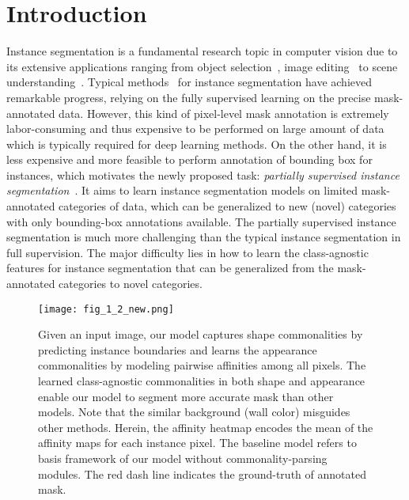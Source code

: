 \documentclass[runningheads]{llncs}
\begin{document}
\section{Introduction}
\vspace{-2mm}
Instance segmentation is a fundamental research topic in computer vision due to its extensive applications ranging from object selection~\cite{li2004statistical}, image editing~\cite{rother2004grabcut,vezhnevets2005growcut} to scene understanding~\cite{li2003foreground}. Typical methods~\cite{chen2018masklab,he2017mask,huang2019mask,li2017fully,liu2018path} for instance segmentation have achieved remarkable progress, relying on the fully supervised learning on the precise mask-annotated data. However, this kind of pixel-level mask annotation is extremely labor-consuming and thus expensive to be performed on large amount of data which is typically required for deep learning methods. On the other hand, it is less expensive and more feasible to perform annotation of bounding box for instances, which motivates the newly proposed task: \emph{partially supervised instance segmentation}~\cite{hu2018learning,kuo2019shapemask}. It aims to learn instance segmentation models on limited mask-annotated categories of data, which can be generalized to new (novel) categories with only bounding-box annotations available. The partially supervised instance segmentation is much more challenging than the typical instance segmentation in full supervision. The major difficulty lies in how to learn the class-agnostic features for instance segmentation that can be generalized from the mask-annotated categories to novel categories. 

\begin{figure}[!t]
\centering
\texttt{[image: fig\_1\_2\_new.png]}
\vspace{-0.15in}
\caption{Given an input image, our model captures shape commonalities by predicting instance boundaries and learns the appearance commonalities by modeling pairwise affinities among all pixels. The learned class-agnostic commonalities in both shape and appearance enable our model to segment more accurate mask than other models. Note that the similar background (wall color) misguides other methods. Herein, the affinity heatmap encodes the mean of the affinity maps for each instance pixel. The baseline model refers to basis framework of our model without commonality-parsing modules. The red dash line indicates the ground-truth of annotated mask.}
\label{fig:intro_example}
\vspace{-0.25in}
\end{figure}
\end{document}
